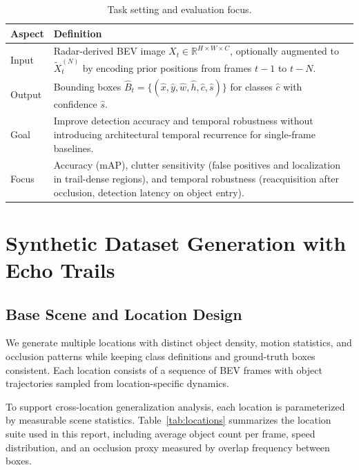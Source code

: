 \documentclass[twocolumn, 10pt]{article}
\begin{document}
\begin{table}[t]
\centering
\caption{Task setting and evaluation focus.}
\label{tab:task_setting}
\begin{tabular}{@{}p{17mm}p{60mm}@{}}
\toprule
\textbf{Aspect} & \textbf{Definition} \\
\midrule
Input & Radar-derived BEV image $X_t \in \mathbb{R}^{H \times W \times C}$, optionally augmented to $\tilde{X}_t^{(N)}$ by encoding prior positions from frames $t-1$ to $t-N$. \\
Output & Bounding boxes $\hat{B}_t=\{(\hat{x},\hat{y},\hat{w},\hat{h},\hat{c},\hat{s})\}$ for classes $\hat{c}$ with confidence $\hat{s}$. \\
Goal & Improve detection accuracy and temporal robustness without introducing architectural temporal recurrence for single-frame baselines. \\
Focus & Accuracy (mAP), clutter sensitivity (false positives and localization in trail-dense regions), and temporal robustness (reacquisition after occlusion, detection latency on object entry). \\
\bottomrule
\end{tabular}
\end{table}

\section{Synthetic Dataset Generation with Echo Trails}
\subsection{Base Scene and Location Design}
We generate multiple locations with distinct object density, motion statistics, and occlusion patterns while keeping class definitions and ground-truth boxes consistent. Each location consists of a sequence of BEV frames with object trajectories sampled from location-specific dynamics.

To support cross-location generalization analysis, each location is parameterized by measurable scene statistics. Table~\ref{tab:locations} summarizes the location suite used in this report, including average object count per frame, speed distribution, and an occlusion proxy measured by overlap frequency between boxes.
\end{document}
